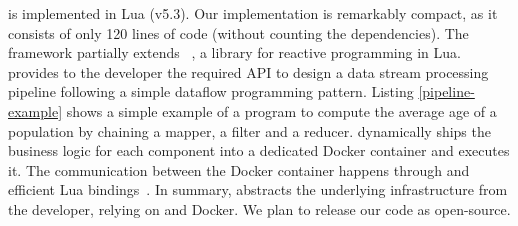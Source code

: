 %
%


\SYS is implemented in Lua (v5.3).
Our implementation is remarkably compact, as it consists of only 120 lines of code (without counting the dependencies).
The framework partially extends \rxl~\cite{github:rxlua}, a library for reactive programming in Lua.
\rxl provides to the developer the required API to design a data stream processing pipeline following a simple dataflow programming pattern\cite{uustalu_essence_2005}.
Listing \ref{pipeline-example} shows a simple example of a \rxl program to compute the average age of a population by chaining a mapper, a filter and a reducer.
\SYS dynamically ships the business logic for each component into a dedicated Docker container and executes it.
The communication between the Docker container happens through \zmq and efficient Lua bindings~\cite{github:lzmq}.
In summary, \SYS abstracts the underlying infrastructure from the developer, relying on \zmq and Docker.
We plan to release our code as open-source.
